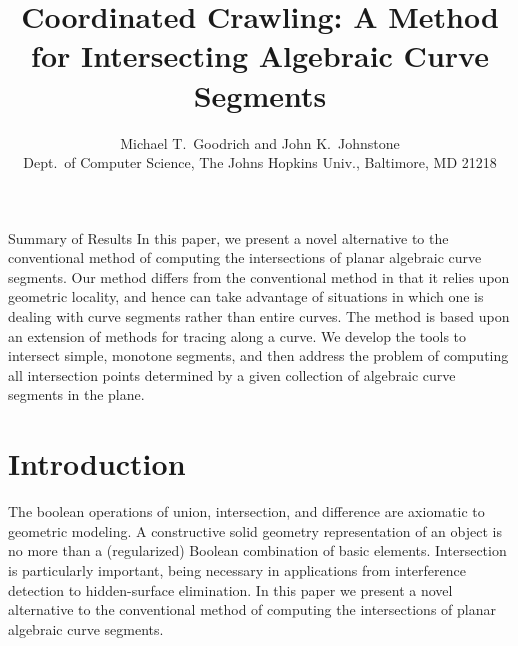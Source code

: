 %
%
\newif\ifFull
\Fullfalse		%
%
%
\ifFull
  \documentstyle[12pt,titlepage]{article}
\else
\fi
%

%
%
\DoubleSpace
\setlength{\oddsidemargin}{0pt}
\setlength{\evensidemargin}{0pt}
\setlength{\headsep}{0pt}
\setlength{\topmargin}{0pt}
\setlength{\textheight}{8.75in}
\setlength{\textwidth}{6.5in}
%
\title{Coordinated Crawling: A Method for Intersecting Algebraic Curve Segments}
\author{Michael T.\ Goodrich and John K.\ Johnstone \\[5pt]
	Dept.\ of Computer Science, The Johns Hopkins Univ., Baltimore,
	MD 21218}
%

%
\maketitle
%
\begin{summary}{Summary of Results}
In this paper, we present a novel alternative to the 
conventional method of computing the intersections of planar algebraic curve segments.
Our method differs from the conventional method
in that it relies upon geometric locality, and hence can take advantage of
situations in which one is dealing with curve segments rather than entire curves.
The method is based upon an extension of methods for tracing along a curve.
We develop the tools to intersect simple, monotone segments, and then
address the problem of computing all intersection points determined by
a given collection of algebraic curve segments in the plane.
\end{summary}

\section{Introduction} 
The boolean operations of union, intersection, and 
difference are axiomatic to geometric modeling.
A constructive solid geometry representation of an object is no more than
a (regularized) Boolean combination of basic elements.
Intersection is particularly important, being necessary in applications from
interference detection to hidden-surface elimination.
In this paper we present a novel alternative to the 
conventional method of computing the intersections of planar algebraic curve segments.

